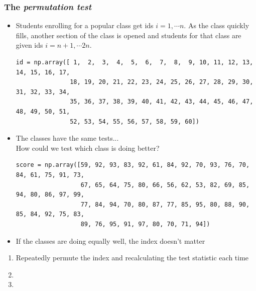\documentclass[xcolor={dvipsnames}]{beamer}
\begin{document}
\begin{frame}[fragile]
 \frametitle{The \emph{permutation test}}

\small
\begin{itemize}
\item Students enrolling for a popular class get ids $i = 1, \cdots n$.
As the class quickly fills, another section of the class is opened and students for that class are given ids $i = n+1, \cdots 2n$.
\tiny
\begin{verbatim}
id = np.array([ 1,  2,  3,  4,  5,  6,  7,  8,  9, 10, 11, 12, 13, 14, 15, 16, 17,
               18, 19, 20, 21, 22, 23, 24, 25, 26, 27, 28, 29, 30, 31, 32, 33, 34,
               35, 36, 37, 38, 39, 40, 41, 42, 43, 44, 45, 46, 47, 48, 49, 50, 51,
               52, 53, 54, 55, 56, 57, 58, 59, 60])
\end{verbatim}        
\small
\item<2-> The classes have the same tests...\\How could we test which class is doing better?

\tiny
\begin{verbatim}
score = np.array([59, 92, 93, 83, 92, 61, 84, 92, 70, 93, 76, 70, 84, 61, 75, 91, 73,
                  67, 65, 64, 75, 80, 66, 56, 62, 53, 82, 69, 85, 94, 80, 86, 97, 99,
                  77, 84, 94, 70, 80, 87, 77, 85, 95, 80, 88, 90, 85, 84, 92, 75, 83,
                  89, 76, 95, 91, 97, 80, 70, 71, 94])
\end{verbatim}        
\item<3-> If the classes are doing equally well, the index doesn't matter \\
\end{itemize}
\scriptsize
\begin{enumerate}
\color{gray}
\item<5->  Repeatedly permute the index and recalculating the test statistic each time 
\item {}
\item {}
\end{enumerate}

\end{frame}
\end{document}
